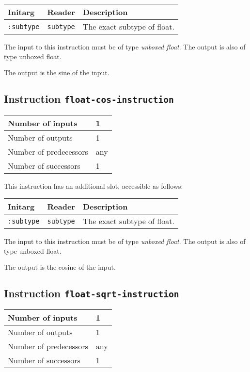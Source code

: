 \begin{tabular}{|l|l|l|}
  \hline
  Initarg & Reader & Description\\
  \hline\hline
  \texttt{:subtype} & \texttt{subtype} & The exact subtype of float.\\
  \hline
\end{tabular}

The input to this instruction must be of type \emph{unboxed
  float}. The output is also of type unboxed float.

The output is the sine of the input.

\subsection{Instruction \texttt{float-cos-instruction}}
\label{hir-instruction-float-div}

\begin{tabular}{|l|l|}
\hline
Number of inputs & 1\\
\hline
Number of outputs & 1\\
\hline
Number of predecessors & any\\
\hline
Number of successors & 1\\
\hline
\end{tabular}

This instruction has an additional slot, accessible as follows:

\begin{tabular}{|l|l|l|}
  \hline
  Initarg & Reader & Description\\
  \hline\hline
  \texttt{:subtype} & \texttt{subtype} & The exact subtype of float.\\
  \hline
\end{tabular}

The input to this instruction must be of type \emph{unboxed
  float}. The output is also of type unboxed float.

The output is the cosine of the input.

\subsection{Instruction \texttt{float-sqrt-instruction}}
\label{hir-instruction-float-div}

\begin{tabular}{|l|l|}
\hline
Number of inputs & 1\\
\hline
Number of outputs & 1\\
\hline
Number of predecessors & any\\
\hline
Number of successors & 1\\
\hline
\end{tabular}

